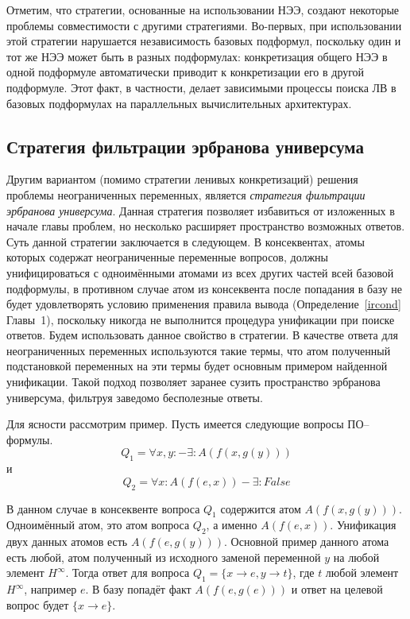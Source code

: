 Отметим, что стратегии, основанные на использовании НЭЭ, создают некоторые проблемы совместимости с другими стратегиями. Во-первых, при использовании этой стратегии нарушается независимость базовых подформул, поскольку один и тот же НЭЭ может быть в разных подформулах: конкретизация общего НЭЭ в одной подформуле автоматически приводит к конкретизации его в другой подформуле. Этот факт, в частности, делает зависимыми процессы поиска ЛВ в базовых подформулах на параллельных вычислительных архитектурах.

\subsection{Стратегия фильтрации эрбранова универсума}
Другим вариантом (помимо стратегии ленивых конкретизаций) решения проблемы неограниченных переменных, является \emph{стратегия фильтрации эрбранова универсума}. Данная стратегия позволяет избавиться от изложенных в начале главы проблем, но несколько расширяет пространство возможных ответов. Суть данной стратегии заключается в следующем. В консеквентах, атомы которых содержат неограниченные переменные вопросов, должны унифицироваться с одноимёнными атомами из всех других частей всей базовой подформулы, в противном случае атом из консеквента после попадания в базу не будет удовлетворять условию применения правила вывода (Определение~\ref{ircond} Главы~1), поскольку никогда не выполнится процедура унификации при поиске ответов. Будем использовать данное свойство в стратегии. В качестве ответа для неограниченных переменных используются такие термы, что атом полученный подстановкой переменных на эти термы будет основным примером найденной унификации. Такой подход позволяет заранее сузить пространство эрбранова универсума, фильтруя заведомо бесполезные ответы.

Для ясности рассмотрим пример. Пусть имеется следующие вопросы ПО--формулы.
$$Q_1 = \forall x,y: - \exists: A(f(x,g(y)))$$
и
$$Q_2 = \forall x:A(f(e,x)) - \exists: False$$

В данном случае в консеквенте вопроса $Q_1$ содержится атом $A(f(x,g(y)))$. Одноимённый атом, это атом вопроса $Q_2$, а именно $A(f(e,x))$. Унификация двух данных атомов есть $A(f(e,g(y)))$. Основной пример данного атома есть любой, атом полученный из исходного заменой переменной $y$ на любой элемент $H^{\infty}$. Тогда ответ для вопроса $Q_1 = \{x \rightarrow e, y \rightarrow t\}$, где $t$ любой элемент $H^{\infty}$, например $e$. В базу попадёт факт $A(f(e,g(e)))$ и ответ на целевой вопрос будет $\{x \rightarrow e\}$.


